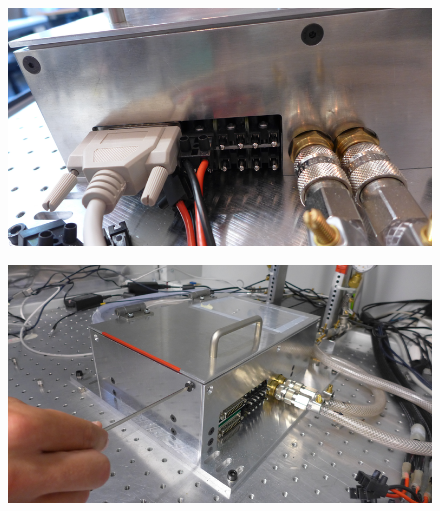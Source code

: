 \documentclass[a4paper,12pt,twoside]{article}
\begin{document}
\begin{appendices}
\begin{itemize}
\end{itemize}
\begin{figure} [h!]
\centering
\begin{minipage}{.48\textwidth}
  \centering
  \includegraphics[width=\textwidth]{./Point2.png}
  \label{Step2}
\end{minipage}%
\hspace{2mm}
\begin{minipage}{.48\textwidth}
  \centering
  \includegraphics[width=\textwidth]{./Point4.png}
  \label{Step4}
\end{minipage}
\end{figure}


\end{appendices}
\end{document}
